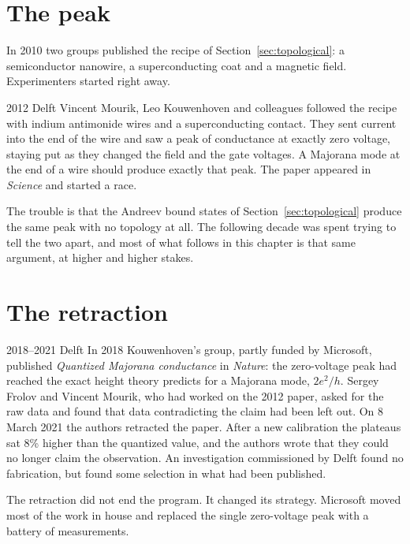 \section{The peak}

In 2010 two groups published the recipe of Section~\ref{sec:topological}: a semiconductor
nanowire, a superconducting coat and a magnetic field. Experimenters started right away.

\begin{history}{2012 \textperiodcentered{} Delft}
Vincent Mourik, Leo Kouwenhoven and colleagues followed the recipe with indium antimonide
wires and a superconducting contact. They sent current into the end of the wire and saw a
peak of conductance at exactly zero voltage, staying put as they changed the field and the
gate voltages. A Majorana mode at the end of a wire should produce exactly that peak. The
paper appeared in \emph{Science} and started a race.
\end{history}

The trouble is that the Andreev bound states of Section~\ref{sec:topological} produce the
same peak with no topology at all. The following decade was spent trying to tell the two
apart, and most of what follows in this chapter is that same argument, at higher and higher
stakes.

\section{The retraction}

\begin{history}{2018--2021 \textperiodcentered{} Delft}
In 2018 Kouwenhoven's group, partly funded by Microsoft, published \emph{Quantized Majorana
conductance} in \emph{Nature}: the zero-voltage peak had reached the exact height theory
predicts for a Majorana mode, $2e^2/h$. Sergey Frolov and Vincent Mourik, who had worked on
the 2012 paper, asked for the raw data and found that data contradicting the claim had been
left out. On 8 March 2021 the authors retracted the paper. After a new calibration the
plateaus sat 8\% higher than the quantized value, and the authors wrote that they could no
longer claim the observation. An investigation commissioned by Delft found no fabrication,
but found some selection in what had been published.
\end{history}

The retraction did not end the program. It changed its strategy. Microsoft moved most of
the work in house and replaced the single zero-voltage peak with a battery of measurements.

